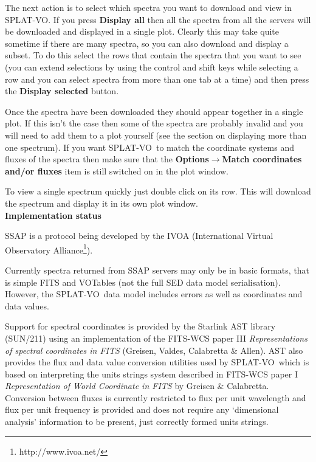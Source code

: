 \documentclass[twoside,11pt]{article}
\newcommand{\htmladdnormallinkfoot}[2]{#1\footnote{#2}}
\newcommand{\htmlref}[2]{#1}
\newcommand{\latexhtml}[2]{#1}
\newcommand{\xref}[3]{#1}
\renewcommand{\_}{\texttt{\symbol{95}}}
\newcommand{\SPLAT}{\textsf{SPLAT-VO}}
\newcommand{\submenuitem}[2]{\latexhtml{\textbf{#1$\rightarrow$#2}}{\textbf{#1->#2}}}
\newcommand{\labelitem}[1]{\textbf{#1}}
\newcommand{\subheading}[1]{\textbf{\large{#1}}}
\begin{document}
The next action is to select which spectra you want to download and view in
\SPLAT. If you press \labelitem{Display all} then all the spectra from all the
servers will be downloaded and displayed in a single plot. Clearly this may
take quite sometime if there are many spectra, so you can also download and
display a subset. To do this select the rows that contain the spectra that
you want to see (you can extend selections by using the control and shift keys
while selecting a row and you can select spectra from more than one tab at a
time) and then press the \labelitem{Display selected} button.

Once the spectra have been downloaded they should appear together in a single
plot. If this isn't the case then some of the spectra are probably invalid and
you will need to add them to a plot yourself (see the section on
\htmlref{displaying more than one spectrum}{displaying_more_than_one_spectrum}).
If you want \SPLAT\ to match the coordinate systems and fluxes of the spectra
then make sure that the
\submenuitem{Options}{Match coordinates and/or fluxes}
item is still switched on in the plot window.

To view a single spectrum quickly just double click on its row. This will
download the spectrum and display it in its own plot window.\\

\subheading{Implementation status}

SSAP is a protocol being developed by the IVOA
(\htmladdnormallinkfoot{International Virtual Observatory Alliance}
{http://www.ivoa.net/}).

Currently spectra returned from SSAP servers may only be in basic formats,
that is simple FITS and VOTables (not the full SED data model serialisation).
However, the \SPLAT\ data model includes errors as well as coordinates and
data values.

Support for spectral coordinates is provided by the Starlink AST library
(\xref{SUN/211}{sun211}{}) using an implementation of the FITS-WCS paper III
\textit{Representations of spectral coordinates in FITS}
(Greisen,
Valdes, Calabretta \& Allen).
AST also provides the flux and data value conversion utilities used by
\SPLAT\ which is based on interpreting the units strings system described
in FITS-WCS paper I \textit{Representation of World Coordinate in FITS}
by Greisen \& Calabretta.
Conversion between fluxes is currently restricted to flux per unit wavelength
and flux per unit frequency is provided and does not require any `dimensional
analysis' information to be present, just correctly formed units strings.
\end{document}
